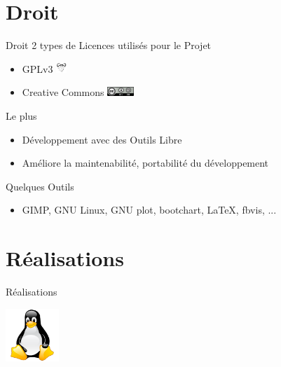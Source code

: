 \documentclass[11pt]{beamer}
\begin{document}
	\section{Droit}
	
	\begin{frame}{Droit}
	2 types de Licences utilisés pour le Projet
	\pause	
	\begin{itemize}
		\item GPLv3 \includegraphics[width=0.4cm]{common/gnu.png}	\\
		\href{http://www.tldrlegal.com/license/gnu-general-public-license-v3-(gpl-3)}{}
		
	\end{itemize}
	\pause	
	\begin{itemize}
		\item Creative Commons 	\includegraphics[width=1cm]{common/cc.png}\\
		\href{http://creativecommons.org/licenses/by-sa/4.0/}{}
	\pause	
	\end{itemize}
	\begin{block}{Le plus}
			\begin{itemize}
			\item Développement avec des Outils Libre
			\item Améliore la maintenabilité, portabilité du développement
		\end{itemize}
		\end{block}
		\pause
		\begin{block}{Quelques Outils}
			\begin{itemize}
			\item GIMP, GNU Linux, GNU plot, bootchart, \LaTeX, fbvis, ...
		\end{itemize}
		\end{block}
	\end{frame}
	
	\section{Réalisations}
	
	\begin{frame}{Réalisations}
		
			\begin{center}
	\includegraphics[width=2cm]{common/tux.png}	
	\end{center}
		
	\end{frame}
	
\end{document}
